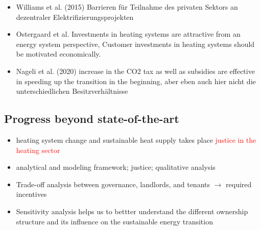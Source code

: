 \begin{itemize}
	\item Williams et al. (2015) \cite{williams2015enabling} Barrieren für Teilnahme des privaten Sektors an dezentraler Elektrifizierungsprojekten
	\item Ostergaard et al. \cite{ostergaard2019costs} Investments in heating systems are attractive from an energy system perspective, Customer investments in heating systems should be motivated economically.
	\item Nageli et al. (2020) \cite{nageli2020policies} increase in the CO2 tax as well as subsidies are effective in speeding up the transition in the beginning, aber eben auch hier nicht die unterschiedlichen Besitzverhältnisse 
\end{itemize}

\subsection{Progress beyond state-of-the-art}
\begin{itemize}
	\item heating system change and sustainable heat supply takes place \textcolor{red}{justice in the heating sector}
	\item analytical and modeling framework; justice; qualitative analysis
	\item Trade-off analysis between governance, landlords, and tenants $\longrightarrow$ required incentives
	\item Sensitivity analysis helps us to bettter understand the different ownership structure and its influence on the sustainable energy transition
\end{itemize}